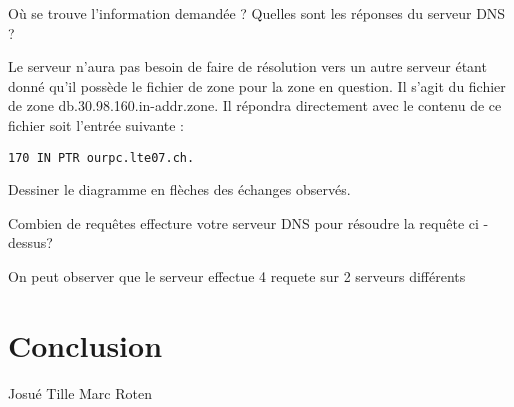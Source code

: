 \documentclass[a4paper, 12pt]{article}
\begin{document}

\begin{question}[resume]
\item Où se trouve l'information demandée ? Quelles sont les réponses du serveur DNS ?
\end{question}

Le serveur n'aura pas besoin de faire de résolution vers un autre serveur étant donné qu'il possède le fichier de zone pour la zone en question. Il s'agit du fichier de zone db.30.98.160.in-addr.zone. Il répondra directement avec le contenu de ce fichier soit l'entrée suivante :

\texttt{170 IN PTR ourpc.lte07.ch.}

\begin{question}[resume]
\item Dessiner le diagramme en flèches des échanges observés.
\end{question}


\begin{question}[resume]
\item Combien de requêtes effecture votre serveur DNS pour résoudre la requête ci -dessus?
\end{question}

On peut observer que le serveur effectue 4 requete sur 2 serveurs différents

\section{Conclusion}



\begin{center}
Josué Tille  \hspace{7cm} Marc Roten
\end{center}
\end{document}
